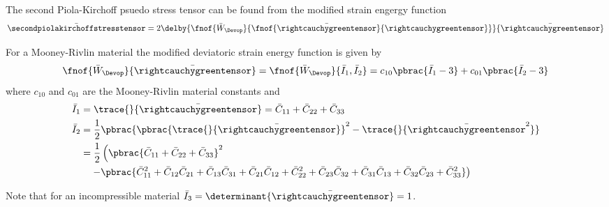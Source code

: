 The second Piola-Kirchoff psuedo stress tensor can be found from the modified strain engergy function \ie
\begin{equation}
  \bar{\secondpiolakirchoffstresstensor}=2\delby{\fnof{\bar{W}_{\Devop}}{\fnof{\bar{\rightcauchygreentensor}}{\rightcauchygreentensor}}}{\bar{\rightcauchygreentensor}}
\end{equation}

For a Mooney-Rivlin material the modified deviatoric strain energy function is given by
\begin{equation}
  \fnof{\bar{W}_{\Devop}}{\bar{\rightcauchygreentensor}}=\fnof{\bar{W}_{\Devop}}{\bar{I}_{1},\bar{I}_{2}}=c_{10}\pbrac{\bar{I}_{1}-3}+c_{01}\pbrac{\bar{I}_{2}-3}
\end{equation}
where $c_{10}$ and $c_{01}$ are the Mooney-Rivlin material constants and
\begin{equation}
  \begin{split}
    \bar{I}_{1}&=\trace{}{\bar{\rightcauchygreentensor}}=\bar{C}_{11}+\bar{C}_{22}+\bar{C}_{33}\\
    \bar{I}_{2}&=\frac{1}{2}\pbrac{\pbrac{\trace{}{\bar{\rightcauchygreentensor}}}^{2}-\trace{}{\bar{\rightcauchygreentensor}^{2}}}
    \\ &=\dfrac{1}{2}\left(\pbrac{\bar{C}_{11}+\bar{C}_{22}+\bar{C}_{33}}^{2}\right. \\ &
    \quad\left.-\pbrac{\bar{C}_{11}^{2}+\bar{C}_{12}\bar{C}_{21}+\bar{C}_{13}\bar{C}_{31}+
      \bar{C}_{21}\bar{C}_{12}+\bar{C}_{22}^{2}+\bar{C}_{23}\bar{C}_{32}+\bar{C}_{31}\bar{C}_{13}+\bar{C}_{32}\bar{C}_{23}+\bar{C}_{33}^{2}}\right)
  \end{split}
\end{equation}

Note that for an incompressible material $\bar{I}_{3}=\determinant{\bar{\rightcauchygreentensor}}=1$.


